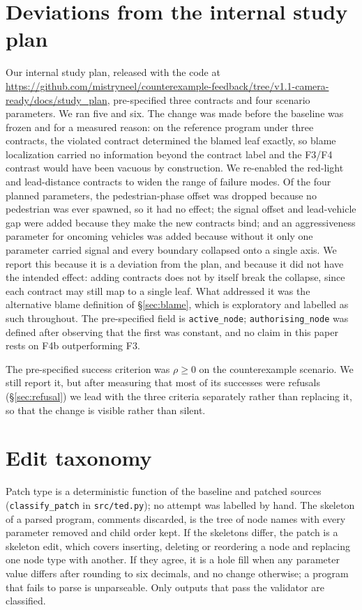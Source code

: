 \documentclass{article}
\begin{document}
\section{Deviations from the internal study plan}
\label{app:deviations}

Our internal study plan, released with the code at
\url{https://github.com/mistryneel/counterexample-feedback/tree/v1.1-camera-ready/docs/study_plan},
pre-specified three contracts and four scenario parameters.
We ran five and six. The change was made before the baseline was frozen and for a
measured reason: on the reference program under three contracts, the violated
contract determined the blamed leaf exactly, so blame localization carried no
information beyond the contract label and the F3/F4 contrast would have been
vacuous by construction. We re-enabled the red-light and lead-distance contracts
to widen the range of failure modes. Of the four planned parameters, the
pedestrian-phase offset was dropped because no pedestrian was ever spawned, so it
had no effect; the signal offset and lead-vehicle gap were added because they make
the new contracts bind; and an aggressiveness parameter for oncoming vehicles was
added because without it only one parameter carried signal and every boundary
collapsed onto a single axis. We report this
because it is a deviation from the plan, and because it did not have the intended
effect: adding contracts does not by itself break the collapse, since each
contract may still map to a single leaf. What addressed it was the alternative
blame definition of \S\ref{sec:blame}, which is exploratory and labelled as such
throughout. The pre-specified field is \texttt{active\_node};
\texttt{authorising\_node} was defined after observing that the first was
constant, and no claim in this paper rests on F4b outperforming F3.

The pre-specified success criterion was $\rho \geq 0$ on the counterexample
scenario. We still report it, but after measuring that most of its successes
were refusals (\S\ref{sec:refusal}) we lead with the three criteria separately
rather than replacing it, so that the change is visible rather than silent.

\section{Edit taxonomy}
\label{app:taxonomy}

Patch type is a deterministic function of the baseline and patched sources
(\texttt{classify\_patch} in \texttt{src/ted.py}); no attempt was labelled by
hand. The skeleton of a parsed program, comments discarded, is the tree of node
names with every parameter removed and child order kept. If the skeletons
differ, the patch is a skeleton edit, which covers inserting, deleting or
reordering a node and replacing one node type with another. If they agree, it is
a hole fill when any parameter value differs after rounding to six decimals, and
no change otherwise; a program that fails to parse is unparseable. Only outputs
that pass the validator are classified.
\end{document}
